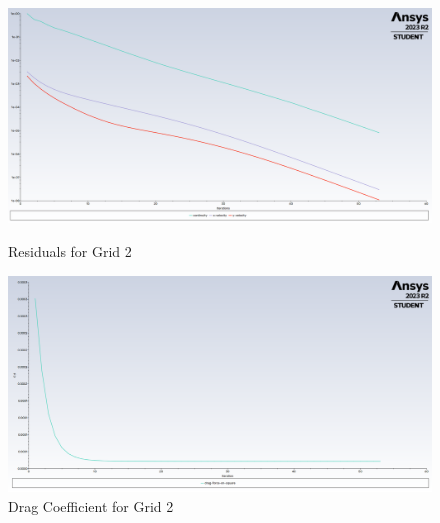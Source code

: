 \begin{figure}[H]
    \centering
    \begin{minipage}{0.45\textwidth}
        \centering
        \includegraphics[width=\textwidth]{Questions/Figures/residuals grid 2.png}
        \caption{Residuals for Grid 2}
        \label{fig:residuals_grid_2}
    \end{minipage}
    \begin{minipage}{0.45\textwidth}
        \centering
        \includegraphics[width=\textwidth]{Questions/Figures/drag force on square grid 2.png}
        \caption{Drag Coefficient for Grid 2}
        \label{fig:drag_coefficient_grid_2}
    \end{minipage}
\end{figure}
